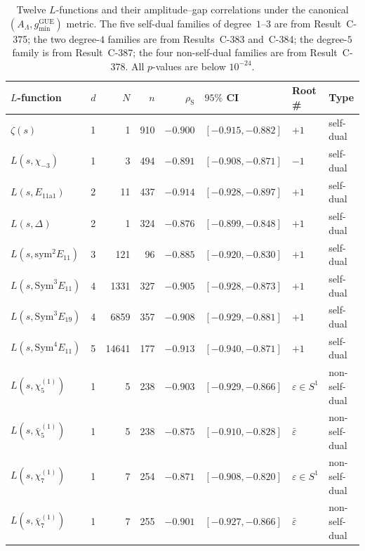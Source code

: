 \documentclass[11pt, a4paper]{article}
\theoremstyle{plain}
\theoremstyle{definition}
\newcommand{\Lam}{\Lambda}
\DeclareMathOperator{\GUE}{GUE}
\begin{document}
\begin{table}[t]
\centering
\caption{Twelve $L$-functions and their amplitude--gap correlations
under the canonical $(A_\Lam, g_{\min}^{\GUE})$ metric.
The five self-dual families of degree~$1$--$3$ are from Result~C-375;
the two degree-$4$ families are from Results~C-383 and~C-384;
the degree-$5$ family is from Result~C-387;
the four non-self-dual families are from Result~C-378.
All $p$-values are below $10^{-24}$.}
\label{tab:nine_families}
\small
\begin{tabular}{llrrrlll}
\toprule
\textbf{$L$-function} & $d$ & $N$ & $n$ &
$\rho_{\mathrm{S}}$ & \textbf{$95\%$ CI} &
\textbf{Root \#} & \textbf{Type} \\
\midrule
$\zeta(s)$                           & 1 & 1   & 910 & $-0.900$ & $[-0.915,-0.882]$ & $+1$                   & self-dual \\
$L(s,\chi_{-3})$                     & 1 & 3   & 494 & $-0.891$ & $[-0.908,-0.871]$ & $-1$                   & self-dual \\
$L(s,E_{11\mathrm{a}1})$            & 2 & 11  & 437 & $-0.914$ & $[-0.928,-0.897]$ & $+1$                   & self-dual \\
$L(s,\Delta)$                        & 2 & 1   & 324 & $-0.876$ & $[-0.899,-0.848]$ & $+1$                   & self-dual \\
$L(s,\mathrm{sym}^2 E_{11})$        & 3 & 121 & 96  & $-0.885$ & $[-0.920,-0.830]$ & $+1$                   & self-dual \\
$L(s,\mathrm{Sym}^3 E_{11})$       & 4 & 1331 & 327 & $-0.905$ & $[-0.928,-0.873]$ & $+1$                  & self-dual \\
$L(s,\mathrm{Sym}^3 E_{19})$       & 4 & 6859 & 357 & $-0.908$ & $[-0.929,-0.881]$ & $+1$                  & self-dual \\
$L(s,\mathrm{Sym}^4 E_{11})$       & 5 & 14641 & 177 & $-0.913$ & $[-0.940,-0.871]$ & $+1$                  & self-dual \\
\midrule
$L(s,\chi_{5}^{(1)})$               & 1 & 5   & 238 & $-0.903$ & $[-0.929,-0.866]$ & $\varepsilon \in S^1$  & non-self-dual \\
$L(s,\bar{\chi}_{5}^{(1)})$         & 1 & 5   & 238 & $-0.875$ & $[-0.910,-0.828]$ & $\bar{\varepsilon}$    & non-self-dual \\
$L(s,\chi_{7}^{(1)})$               & 1 & 7   & 254 & $-0.871$ & $[-0.908,-0.820]$ & $\varepsilon \in S^1$  & non-self-dual \\
$L(s,\bar{\chi}_{7}^{(1)})$         & 1 & 7   & 255 & $-0.901$ & $[-0.927,-0.866]$ & $\bar{\varepsilon}$    & non-self-dual \\

\end{tabular}
\end{table}
\end{document}
